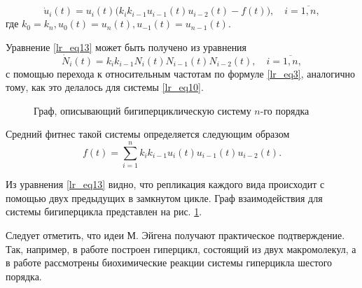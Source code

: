 \begin{equation}
\dot{u}_{i}(t) = u_{i}(t)\Big(k_{i}k_{i - 1}u_{i- 1}(t)u_{i - 2}(t) - f(t)\Big), \quad i = \overline{1, n},
\label{lr_eq13}
\end{equation}  
где $k_{0} = k_{n}, u_{0}(t) = u_{n}(t), u_{-1}(t) = u_{n - 1}(t)$. 

Уравнение \eqref{lr_eq13} может быть получено из уравнения
$$
\dot{N}_{i}(t) = k_{i}k_{i - 1}N_{i}(t)N_{i - 1}(t)N_{i - 2}(t), \quad i = \overline{1, n},
$$
с помощью перехода к относительным частотам по формуле \eqref{lr_eq3}, аналогично тому, как это делалось для системы \eqref{lr_eq10}.

\begin{figure}[ht]
\caption{Граф, описывающий бигиперциклическую систему $n$-го порядка}
\label{lr_fig5}
\end{figure}

Средний фитнес такой системы определяется следующим образом
$$
f(t) = \sum\limits_{i = 1}^{n}k_{i}k_{i - 1}u_{i}(t)u_{i - 1}(t)u_{i - 2}(t).
$$

Из уравнения \eqref{lr_eq13} видно, что репликация каждого вида происходит с помощью двух предыдущих в замкнутом цикле. Граф взаимодействия для системы бигиперцикла представлен на рис. \ref{lr_fig5}.

Следует отметить, что идеи М. Эйгена получают практическое подтверждение. Так, например, в работе \cite{Lincoln} построен гиперцикл, состоящий из двух макромолекул, а в работе \cite{Vaidya} рассмотрены биохимические реакции системы гиперцикла шестого порядка.




